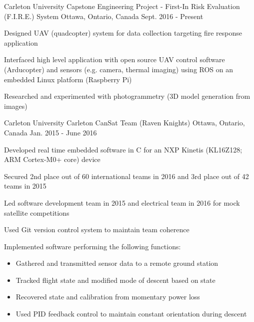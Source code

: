 

\begin{cventries}

  \cventry
    {Carleton University} %
    {Capstone Engineering Project - First-In Risk Evaluation (F.I.R.E.) System} %
    {Ottawa, Ontario, Canada} %
    {Sept. 2016 - Present} %
    {
      \begin{cvitems} %
        \item {Designed UAV (quadcopter) system for data collection targeting fire response application}
        \item {Interfaced high level application with open source UAV control software (Arducopter) and sensors (e.g. camera, thermal imaging) using ROS on an embedded Linux platform (Raspberry Pi)}
        \item {Researched and experimented with photogrammetry (3D model generation from images)}
      \end{cvitems}
    }

  \cventry
    {Carleton University} %
    {Carleton CanSat Team (Raven Knights)} %
    {Ottawa, Ontario, Canada} %
    {Jan. 2015 - June 2016} %
    {
      \begin{cvitems} %
        \item {Developed real time embedded software in C for an NXP Kinetis (KL16Z128; ARM Cortex-M0+ core) device}
        \item {Secured 2nd place out of 60 international teams in 2016 and 3rd place out of 42 teams in 2015}
        \item {Led software development team in 2015 and electrical team in 2016 for mock satellite competitions}
        \item {Used Git version control system to maintain team coherence}
        \item {Implemented software performing the following functions:}
        \begin{itemize}
          \item {Gathered and transmitted sensor data to a remote ground station}
          \item {Tracked flight state and modified mode of descent based on state}
          \item {Recovered state and calibration from momentary power loss}
          \item {Used PID feedback control to maintain constant orientation during descent}
        \end{itemize}
      \end{cvitems}
    }


\end{cventries}
